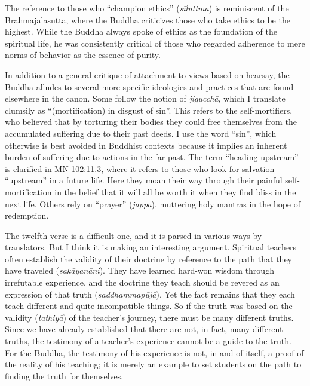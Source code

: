 \documentclass[12pt,openany]{book}%
\begin{document}
The reference to those who “champion ethics” (\textit{\textsanskrit{sīluttma}}) is reminiscent of the Brahmajalasutta, where the Buddha criticizes those who take ethics to be the highest. While the Buddha always spoke of ethics as the foundation of the spiritual life, he was consistently critical of those who regarded adherence to mere norms of behavior as the essence of purity.

In addition to a general critique of attachment to views based on hearsay, the Buddha alludes to several more specific ideologies and practices that are found elsewhere in the canon. Some follow the notion of \textit{\textsanskrit{jigucchā}}, which I translate clumsily as “(mortification) in disgust of sin”. This refers to the self-mortifiers, who believed that by torturing their bodies they could free themselves from the accumulated suffering due to their past deeds. I use the word “sin”, which otherwise is best avoided in Buddhist contexts because it implies an inherent burden of suffering due to actions in the far past. The term “heading upstream” is clarified in MN 102:11.3, where it refers to those who look for salvation “upstream” in a future life. Here they moan their way through their painful self-mortification in the belief that it will all be worth it when they find bliss in the next life. Others rely on “prayer” (\textit{jappa}), muttering holy mantras in the hope of redemption.

The twelfth verse is a difficult one, and it is parsed in various ways by translators. But I think it is making an interesting argument. Spiritual teachers often establish the validity of their doctrine by reference to the path that they have traveled (\textit{\textsanskrit{sakāyanāni}}). They have learned hard-won wisdom through irrefutable experience, and the doctrine they teach should be revered as an expression of that truth (\textit{\textsanskrit{saddhammapūjā}}). Yet the fact remains that they each teach different and quite incompatible things. So if the truth was based on the validity (\textit{\textsanskrit{tathiyā}}) of the teacher’s journey, there must be many different truths. Since we have already established that there are not, in fact, many different truths, the testimony of a teacher’s experience cannot be a guide to the truth. For the Buddha, the testimony of his experience is not, in and of itself, a proof of the reality of his teaching; it is merely an example to set students on the path to finding the truth for themselves.
\end{document}
